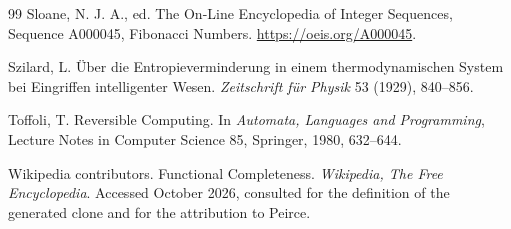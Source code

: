 \documentclass[11pt]{article}
\theoremstyle{definition}
\theoremstyle{remark}
\begin{document}
\begin{thebibliography}{99}
Sloane, N. J. A., ed. The On-Line Encyclopedia of Integer Sequences, Sequence A000045, Fibonacci Numbers. \url{https://oeis.org/A000045}.

Szilard, L. \"Uber die Entropieverminderung in einem thermodynamischen System bei Eingriffen intelligenter Wesen. \emph{Zeitschrift f\"ur Physik} 53 (1929), 840--856.

Toffoli, T. Reversible Computing. In \emph{Automata, Languages and Programming}, Lecture Notes in Computer Science 85, Springer, 1980, 632--644.

Wikipedia contributors. Functional Completeness. \emph{Wikipedia, The Free Encyclopedia}. Accessed October 2026, consulted for the definition of the generated clone and for the attribution to Peirce.

\end{thebibliography}
\end{document}
